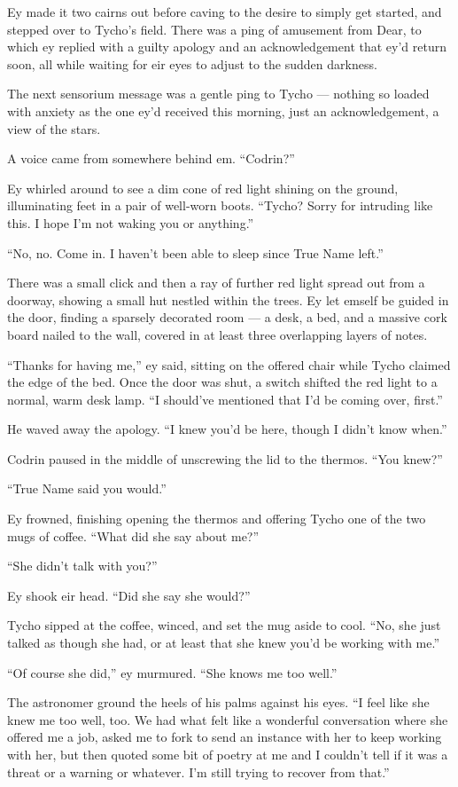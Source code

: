 Ey made it two cairns out before caving to the desire to simply get started, and stepped over to Tycho's field. There was a ping of amusement from Dear, to which ey replied with a guilty apology and an acknowledgement that ey'd return soon, all while waiting for eir eyes to adjust to the sudden darkness.

The next sensorium message was a gentle ping to Tycho — nothing so loaded with anxiety as the one ey'd received this morning, just an acknowledgement, a view of the stars.

A voice came from somewhere behind em. ``Codrin?''

Ey whirled around to see a dim cone of red light shining on the ground, illuminating feet in a pair of well-worn boots. ``Tycho? Sorry for intruding like this. I hope I'm not waking you or anything.''

``No, no. Come in. I haven't been able to sleep since True Name left.''

There was a small click and then a ray of further red light spread out from a doorway, showing a small hut nestled within the trees. Ey let emself be guided in the door, finding a sparsely decorated room — a desk, a bed, and a massive cork board nailed to the wall, covered in at least three overlapping layers of notes.

``Thanks for having me,'' ey said, sitting on the offered chair while Tycho claimed the edge of the bed. Once the door was shut, a switch shifted the red light to a normal, warm desk lamp. ``I should've mentioned that I'd be coming over, first.''

He waved away the apology. ``I knew you'd be here, though I didn't know when.''

Codrin paused in the middle of unscrewing the lid to the thermos. ``You knew?''

``True Name said you would.''

Ey frowned, finishing opening the thermos and offering Tycho one of the two mugs of coffee. ``What did she say about me?''

``She didn't talk with you?''

Ey shook eir head. ``Did she say she would?''

Tycho sipped at the coffee, winced, and set the mug aside to cool. ``No, she just talked as though she had, or at least that she knew you'd be working with me.''

``Of course she did,'' ey murmured. ``She knows me too well.''

The astronomer ground the heels of his palms against his eyes. ``I feel like she knew me too well, too. We had what felt like a wonderful conversation where she offered me a job, asked me to fork to send an instance with her to keep working with her, but then quoted some bit of poetry at me and I couldn't tell if it was a threat or a warning or whatever. I'm still trying to recover from that.''

